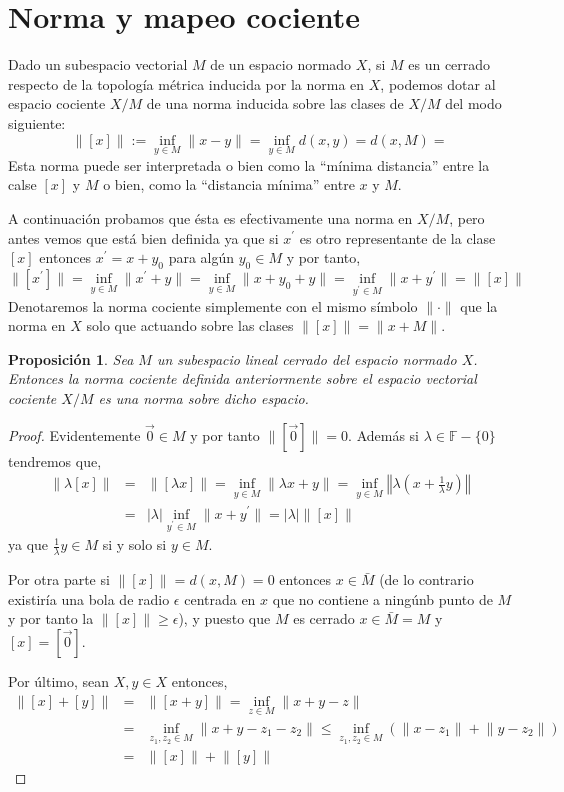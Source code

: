 \documentclass[12pt]{book}
\newtheorem{prop}{\bf Proposición}[chapter]
\begin{document}
\section{Norma y mapeo cociente}
Dado un subespacio vectorial $M$ de un espacio normado  $X$, si $M$ es un cerrado respecto de 
la topología métrica inducida por la norma en $X$,  podemos dotar al espacio cociente $X/M$ de 
una norma inducida sobre  las clases de $X/M$  del  modo siguiente:
$$\lVert [x]\rVert:=\inf_{y\in M}\lVert x-y\rVert= \inf_{y\in M} d(x,y)=d(x,M)=$$
Esta norma puede ser interpretada o bien como la ``mínima distancia'' entre la calse  $[x]$ y $M$ o 
bien, como la ``distancia mínima'' entre $x$ y $M$.

A continuación probamos que \'esta es efectivamente una norma en $X/M$, pero antes vemos que 
est\'a bien definida ya que si $x^\prime$ es otro representante de la clase $[x]$ entonces 
$x^\prime=x+y_0$ para algún $y_0\in M$ y por tanto,
$$\lVert [x^\prime]\rVert=\inf_{y\in M}\lVert x^\prime+y\rVert=\inf_{y\in M}\lVert x+y_0+y\rVert 
=\inf_{y^\prime\in M}\lVert x+y^\prime\rVert=\lVert [x]\rVert$$
Denotaremos la norma cociente simplemente con el mismo símbolo $\lVert \cdot\rVert$ que la 
norma en $X$ solo que actuando sobre las clases $\lVert [x]\rVert=\lVert x+M\rVert$.

\begin{prop} Sea $M$ un subespacio lineal cerrado del espacio normado $X$. Entonces la norma 
cociente definida anteriormente sobre el espacio vectorial cociente $X/M$ es una norma sobre 
dicho espacio.
\end{prop}
\begin{proof}
Evidentemente  $\vec 0\in M$ y por tanto $\lVert [\vec 0]\rVert=0$. Además si $\lambda \in 
\mathbb{F}-\{0\}$ tendremos que,
\begin{eqnarray*}
\lVert \lambda [x]\rVert&=&\lVert [\lambda x]\rVert=\inf_{y\in M}\lVert \lambda x+y\rVert=\inf_{y\in M}
\left\Vert\lambda\left(x+\frac{1}{\lambda} y\right)\right\Vert\\
&=&\lvert \lambda\rvert\inf_{y^\prime\in M}\lVert x+y^\prime\rVert=\lvert \lambda\rvert\lVert [x]\rVert
\end{eqnarray*}
ya que $\frac{1}{\lambda} y\in M$ si y solo si $y\in M$.

Por otra parte si $\lVert [x]\rVert=d(x,M)=0$ entonces $x\in \bar M$ (de lo contrario existiría una 
bola de radio $\epsilon$ centrada en $x$ que no contiene  a ningúnb punto de $M$ y por tanto la $
\lVert [x]\rVert\geq\epsilon$), y puesto que $M$ es cerrado $x\in\bar M=M$ y $[x]=[\vec 0]$.
 
 
   Por último, sean $X, y\in X$ entonces,
   \begin{eqnarray*}
   \lVert [x]+[y]\rVert&=&\lVert [x+y]\rVert=\inf_{z\in M}\lVert x+y-z\rVert\\
   &=& \inf_{z_1,z_2\in M}\lVert x+y-z_1-z_2\rVert\leq\inf_{z_1,z_2\in M}\left(\lVert x-z_1\rVert+\lVert 
y-z_2\rVert\right)\\
   &=&\lVert [x]\rVert+\lVert [y]\rVert
\end{eqnarray*}
   
\end{proof}
\end{document}
